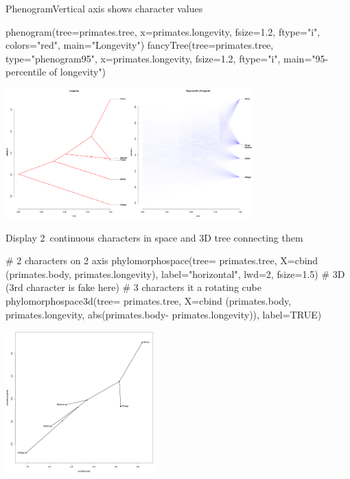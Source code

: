 \documentclass[compress, ucs, xelatex, 11pt, xcolor=svgnames,
	hyperref={
		bookmarks=true,
		unicode=true,
		colorlinks=true,
		pdftitle={Molecular data in R},
		plainpages=false,
		pdfauthor={Vojtech Zeisek},
		pdfsubject={Course about phylogeny and evolution in R},
		pdfcreator={XeLaTeX},
		pdfkeywords={R, evolution, phylogeny, molecular data},
		linkcolor=Tomato,
		anchorcolor=SaddleBrown,
		citecolor=Goldenrod,
		filecolor=DarkMagenta,
		menucolor=Sienna,
		urlcolor=DarkTurquoise,
		pdftex},
	url={hyphens, lowtilde} %
	]{beamer}
\begin{document}
\begin{frame}[fragile]{Phenogram}{Vertical axis shows character values}
	\begin{spluscode}
    phenogram(tree=primates.tree, x=primates.longevity, fsize=1.2,
      ftype="i", colors="red", main="Longevity")
    fancyTree(tree=primates.tree, type="phenogram95", x=primates.longevity,
      fsize=1.2, ftype="i", main="95-percentile of longevity")
	\end{spluscode}
	\begin{center}
		\includegraphics[height=5cm]{phenogram.png}
	\end{center}
\end{frame}

\begin{frame}[fragile]{Display 2~continuous characters in space and 3D tree connecting them}
	\begin{multicols}{2}
		\begin{spluscode}
    # 2 characters on 2 axis
    phylomorphospace(tree=
      primates.tree, X=cbind
      (primates.body,
      primates.longevity),
      label="horizontal",
      lwd=2, fsize=1.5)
    # 3D (3rd character is fake here)
    # 3 characters it a rotating cube
    phylomorphospace3d(tree=
      primates.tree, X=cbind
      (primates.body,
      primates.longevity,
      abs(primates.body-
      primates.longevity)),
      label=TRUE)
		\end{spluscode}
		\begin{center}
			\includegraphics[height=5.5cm]{phylomorphospace.png}
		\end{center}
	\end{multicols}
\end{frame}
\end{document}
